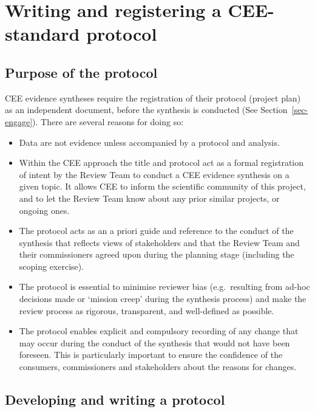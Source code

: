 \documentclass[
  letterpaper,
  DIV=11,
  numbers=noendperiod]{scrreprt}
\begin{document}
\section{\texorpdfstring{\textbf{Writing and registering a CEE-standard
protocol}}{Writing and registering a CEE-standard protocol}}\label{writing-and-registering-a-cee-standard-protocol}

\subsection{\texorpdfstring{\textbf{Purpose of the
protocol}}{Purpose of the protocol}}\label{purpose-of-the-protocol}

CEE evidence syntheses require the registration of their protocol
(project plan) as an independent document, before the synthesis is
conducted (See Section~\ref{sec-engage}). There are several reasons for
doing so:

\begin{itemize}
\item
  Data are not evidence unless accompanied by a protocol and analysis.
\item
  Within the CEE approach the title and protocol act as a formal
  registration of intent by the Review Team to conduct a CEE evidence
  synthesis on a given topic. It allows CEE to inform the scientific
  community of this project, and to let the Review Team know about any
  prior similar projects, or ongoing ones.
\item
  The protocol acts as an a priori guide and reference to the conduct of
  the synthesis that reflects views of stakeholders and that the Review
  Team and their commissioners agreed upon during the planning stage
  (including the scoping exercise).
\item
  The protocol is essential to minimise reviewer bias (e.g.~resulting
  from ad-hoc decisions made or `mission creep' during the synthesis
  process) and make the review process as rigorous, transparent, and
  well-defined as possible.
\item
  The protocol enables explicit and compulsory recording of any change
  that may occur during the conduct of the synthesis that would not have
  been foreseen. This is particularly important to ensure the confidence
  of the consumers, commissioners and stakeholders about the reasons for
  changes.
\end{itemize}

\subsection{\texorpdfstring{\textbf{Developing and writing a
protocol}}{Developing and writing a protocol}}\label{developing-and-writing-a-protocol}
\end{document}
